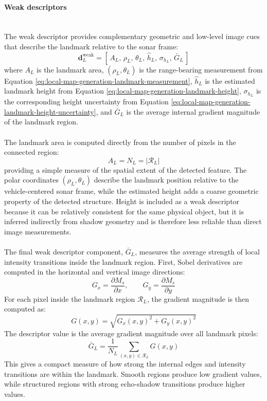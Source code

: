 \newpage

\paragraph{Weak descriptors} \mbox{}\\[0.5em] \noindent
The weak descriptor provides complementary geometric and low-level image cues that describe the landmark relative to the sonar frame:
\begin{equation}
    \mathbf{d}_L^{\text{weak}} =
    [\, A_L,\, \rho_L,\, \theta_L,\, \hat{h}_L,\, \sigma_{h_L},\, \bar{G}_L \,]
    \label{eq:local-map-generation-descriptors-weak}
\end{equation}
where $A_L$ is the landmark area, $(\rho_L,\theta_L)$ is the range-bearing measurement from Equation \ref{eq:local-map-generation-landmark-measurement}, $\hat{h}_L$ is the estimated landmark height from Equation \ref{eq:local-map-generation-landmark-height}, $\sigma_{h_L}$ is the corresponding height uncertainty from Equation \ref{eq:local-map-generation-landmark-height-uncertainty}, and $\bar{G}_L$ is the average internal gradient magnitude of the landmark region.
\\ \\
The landmark area is computed directly from the number of pixels in the connected region:
\begin{equation}
    A_L = N_L = |\mathcal{R}_L|
\end{equation}
providing a simple measure of the spatial extent of the detected feature. The polar coordinates $(\rho_L,\theta_L)$ describe the landmark position relative to the vehicle-centered sonar frame, while the estimated height adds a coarse geometric property of the detected structure. Height is included as a weak descriptor because it can be relatively consistent for the same physical object, but it is inferred indirectly from shadow geometry and is therefore less reliable than direct image measurements.
\\ \\
The final weak descriptor component, $\bar{G}_L$, measures the average strength of local intensity transitions inside the landmark region. First, Sobel derivatives are computed in the horizontal and vertical image directions:
\begin{equation}
    G_x = \frac{\partial M_s}{\partial x},
    \qquad
    G_y = \frac{\partial M_s}{\partial y}
\end{equation}
For each pixel inside the landmark region $\mathcal{R}_L$, the gradient magnitude is then computed as:
\begin{equation}
    G(x,y) = \sqrt{G_x(x,y)^2 + G_y(x,y)^2}
\end{equation}
The descriptor value is the average gradient magnitude over all landmark pixels:
\begin{equation}
    \bar{G}_L =
    \frac{1}{N_L}
    \sum_{(x,y)\in\mathcal{R}_L}
    G(x,y)
    \label{eq:local-map-generation-gradient-descriptor}
\end{equation}
This gives a compact measure of how strong the internal edges and intensity transitions are within the landmark. Smooth regions produce low gradient values, while structured regions with strong echo-shadow transitions produce higher values.


